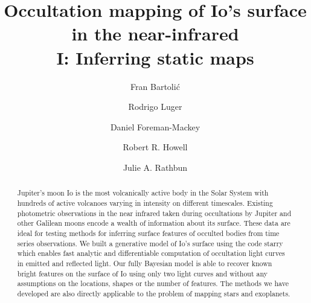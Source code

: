 \documentclass[modern]{aastex62}
\begin{document}
\title{
    \vspace{-3em}
\textbf{Occultation mapping of Io's surface in the near-infrared \\ I: Inferring static maps} 
}
\author{Fran Bartoli\'c}
\author{Rodrigo Luger}
\author{Daniel Foreman-Mackey}
\author{Robert R. Howell}
\author{Julie A. Rathbun}
%

\begin{abstract}
Jupiter's moon Io is the most volcanically active body in the Solar System with hundreds of active volcanoes varying in intensity on different timescales.
Existing photometric observations in the near infrared taken during occultations by Jupiter and other Galilean moons encode a wealth of information about its surface.
These data are ideal for testing methods for inferring surface features of occulted bodies from time series observations.
We built a generative model of Io's surface using the code starry \href{https://rodluger.github.io/starry/}{\color{linkcolor}\faGithub} which enables fast analytic and differentiable computation of occultation light curves in emitted and reflected light.
    Our fully Bayesian model is able to recover known bright features on the surface of Io using only two light curves and without any assumptions on the locations, shapes or the number of features.
    The methods we have developed are also directly applicable to the problem of mapping stars and exoplanets. \href{https://github.com/fbartolic/volcano}{\color{linkcolor}\faGithub}
\end{abstract}

%
\end{document}
